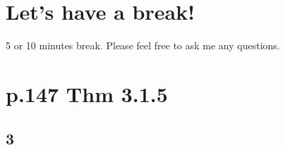 \documentclass[a4paper, 14pt, dvipdfmx]{extarticle}
\begin{document}



\section*{Let's have a break!}

5 or 10 minutes break.
Please feel free to ask me any questions.

\section*{p.147 Thm 3.1.5}

\subsection*{3}
\end{document}

